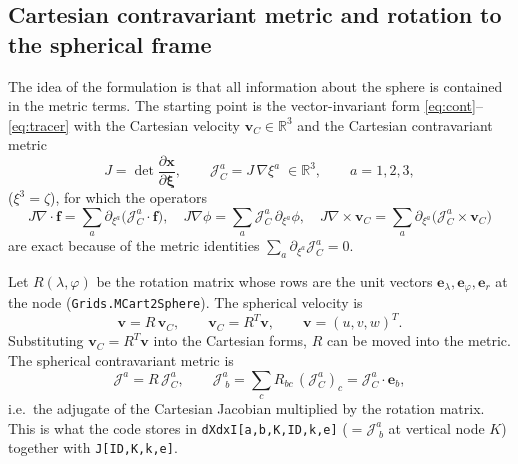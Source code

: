 \documentclass[11pt,a4paper]{article}
\newcommand{\vv}{\bm{v}}
\newcommand{\Jm}{\mathcal{J}}
\newcommand{\code}[1]{\texttt{#1}}
\begin{document}
\subsection{Cartesian contravariant metric and rotation to the spherical frame}
\label{sec:sphframe}

The idea of the formulation is that all information about the sphere is
contained in the metric terms. The starting point is the vector-invariant
form \eqref{eq:cont}--\eqref{eq:tracer} with the Cartesian velocity
$\vv_C\in\mathbb R^3$ and the Cartesian contravariant metric
\begin{equation}
  J = \det\frac{\partial\bm x}{\partial\bm\xi},\qquad
  \Jm^a_C = J\,\nabla\xi^a \;\in\mathbb R^3,\qquad a = 1,2,3,
\end{equation}
($\xi^3=\zeta$), for which the operators
\begin{equation}
  J\nabla\cdot\bm f = \sum_{a}\partial_{\xi^a}\bigl(\Jm^a_C\cdot\bm f\bigr),\quad
  J\nabla\phi = \sum_a \Jm^a_C\,\partial_{\xi^a}\phi,\quad
  J\nabla\times\vv_C = \sum_a \partial_{\xi^a}\bigl(\Jm^a_C\times\vv_C\bigr)
  \label{eq:cartops}
\end{equation}
are exact because of the metric identities $\sum_a\partial_{\xi^a}\Jm^a_C = 0$.

Let $R(\lambda,\varphi)$ be the rotation matrix whose rows are the unit
vectors $\bm e_\lambda,\bm e_\varphi,\bm e_r$ at the node
(\code{Grids.MCart2Sphere}). The spherical velocity is
\begin{equation}
  \vv = R\,\vv_C,\qquad \vv_C = R^T\vv,\qquad \vv = (u,v,w)^T .
\end{equation}
Substituting $\vv_C = R^T\vv$ into the Cartesian forms, $R$ can be moved
into the metric. The spherical contravariant metric is
\begin{equation}
  \Jm^a = R\,\Jm^a_C, \qquad
  \Jm^a_{\;b} = \sum_c R_{bc}\,(\Jm^a_C)_c = \Jm^a_C\cdot\bm e_b,
  \label{eq:adjrot}
\end{equation}
i.e.\ the adjugate of the Cartesian Jacobian multiplied by the rotation
matrix. This is what the code stores in \code{dXdxI[a,b,K,ID,k,e]}
($=\Jm^a_{\;b}$ at vertical node $K$) together with \code{J[ID,K,k,e]}.
\end{document}
